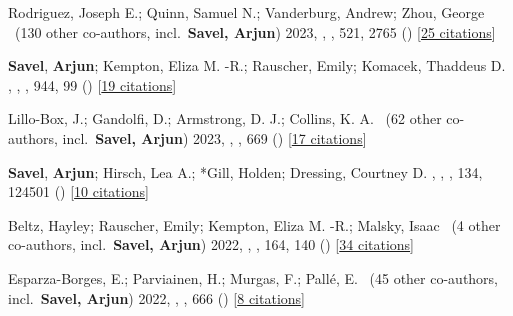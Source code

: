 \item[{\color{numcolor}\scriptsize21}] Rodriguez, Joseph E.; Quinn, Samuel N.; Vanderburg, Andrew; Zhou, George \etal\ ({130} other co-authors, incl.\ \textbf{Savel, Arjun}) 2023, , \mnras, {521}, 2765 () [\href{https://ui.adsabs.harvard.edu/abs/2023MNRAS.521.2765R}{25 citations}]

\item[{\color{numcolor}\scriptsize20}] \textbf{Savel}, \textbf{Arjun}; Kempton, Eliza M. -R.; Rauscher, Emily; Komacek, Thaddeus D. , , \apj, {944}, 99 () [\href{https://ui.adsabs.harvard.edu/abs/2023ApJ...944...99S}{19 citations}]

\item[{\color{numcolor}\scriptsize19}] Lillo-Box, J.; Gandolfi, D.; Armstrong, D. J.; Collins, K. A. \etal\ ({62} other co-authors, incl.\ \textbf{Savel, Arjun}) 2023, , \aanda, {669} () [\href{https://ui.adsabs.harvard.edu/abs/2023A&A...669A.109L}{17 citations}]

\item[{\color{numcolor}\scriptsize18}] \textbf{Savel}, \textbf{Arjun}; Hirsch, Lea A.; *Gill, Holden; Dressing, Courtney D. , , \pasp, {134}, 124501 () [\href{https://ui.adsabs.harvard.edu/abs/2022PASP..134l4501S}{10 citations}]

\item[{\color{numcolor}\scriptsize17}] Beltz, Hayley; Rauscher, Emily; Kempton, Eliza M. -R.; Malsky, Isaac \etal\ ({4} other co-authors, incl.\ \textbf{Savel, Arjun}) 2022, , \aj, {164}, 140 () [\href{https://ui.adsabs.harvard.edu/abs/2022AJ....164..140B}{34 citations}]

\item[{\color{numcolor}\scriptsize16}] Esparza-Borges, E.; Parviainen, H.; Murgas, F.; Pall{\'e}, E. \etal\ ({45} other co-authors, incl.\ \textbf{Savel, Arjun}) 2022, , \aanda, {666} () [\href{https://ui.adsabs.harvard.edu/abs/2022A&A...666A..10E}{8 citations}]

